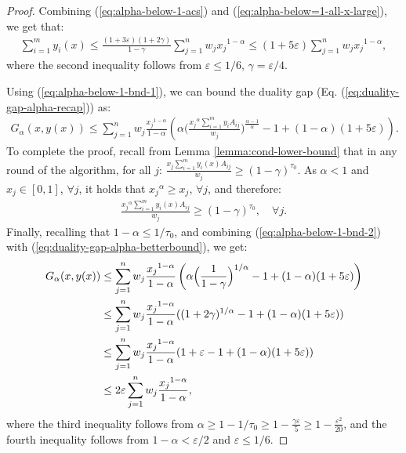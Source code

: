 \documentclass[11pt]{article}
\begin{document}
\begin{proof}
Combining (\ref{eq:alpha-below-1-acs}) and (\ref{eq:alpha-below=1-all-x-large}), we get that:
\begin{align}\label{eq:alpha-below-1-bnd-1}
\sum_{i=1}^m y_i(x) \leq \frac{(1+3\varepsilon)(1+2\gamma)}{1-\gamma}\sum_{j=1}^n w_j {x_j}^{1-\alpha} \leq (1+5\varepsilon) \sum_{j=1}^n w_j {x_j}^{1-\alpha},
\end{align}
where the second inequality follows from $\varepsilon\leq 1/6$, $\gamma = \varepsilon/4$.

Using (\ref{eq:alpha-below-1-bnd-1}), we can bound the duality gap (Eq. (\ref{eq:duality-gap-alpha-recap})) as:
\begin{align}\label{eq:duality-gap-alpha-betterbound}
G_{\alpha}(x, y(x)) \leq \sum_{j=1}^n w_j \frac{{x_j}^{1-\alpha}}{1-\alpha} \left(\alpha\Big(\frac{{x_j}^{\alpha}\sum_{i=1}^m y_i A_{ij}}{w_j}\Big)^{\frac{\alpha-1}{\alpha}}-1 + (1-\alpha)(1+5\varepsilon)\right).
\end{align}
To complete the proof, recall from Lemma \ref{lemma:cond-lower-bound} that in any round of the algorithm, for all $j$: $ \frac{x_j \sum_{i=1}^m y_i(x)A_{ij}}{w_j} \geq (1-\gamma)^{\tau_0}$. As $\alpha < 1$ and $x_j \in [0, 1]$, $\forall j$, it holds that ${x_j}^{\alpha} \geq x_j$, $\forall j$, and therefore:
\begin{align}\label{eq:alpha-below-1-bnd-2}
\frac{{x_j}^{\alpha} \sum_{i=1}^m y_i(x)A_{ij}}{w_j} \geq (1-\gamma)^{\tau_0}, \quad \forall j.
\end{align}
Finally, recalling that $1-\alpha \leq 1/\tau_0$, and combining (\ref{eq:alpha-below-1-bnd-2}) with (\ref{eq:duality-gap-alpha-betterbound}), we get:
\begin{align}
G_{\alpha}(x, y(x))&\leq \sum_{j=1}^n w_j \frac{{x_j}^{1-\alpha}}{1-\alpha} \left(\alpha\Big(\frac{1}{1-\gamma}\Big)^{1/\alpha} -1 + (1-\alpha)(1+5\varepsilon) \right)\notag\\ 
&\leq \sum_{j=1}^n w_j \frac{{x_j}^{1-\alpha}}{1-\alpha}((1 + {2\gamma})^{1/\alpha} - 1  + (1-\alpha)(1+5\varepsilon))\notag\\
&\leq \sum_{j=1}^n w_j \frac{{x_j}^{1-\alpha}}{1-\alpha} (1 + \varepsilon - 1  + (1-\alpha)(1+5\varepsilon)) \notag\\
&\leq 2\varepsilon \sum_{j=1}^n w_j \frac{{x_j}^{1-\alpha}}{1-\alpha},\notag
\end{align}
where the third inequality follows from $\alpha \geq 1 - 1/\tau_0 \geq 1 - \frac{\gamma \varepsilon}{5}\geq 1 - \frac{\varepsilon^2}{20}$, and the fourth inequality follows from $1-\alpha < \varepsilon/2$ and $\varepsilon \leq 1/6$.
\end{proof}
\fi
\end{document}
